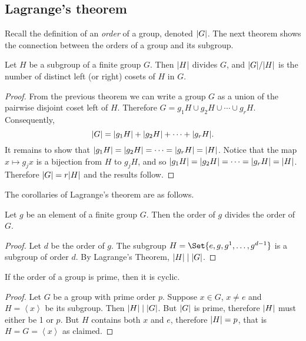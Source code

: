 \documentclass[main.tex]{subfiles}
\begin{document}
			\subsection{Lagrange’s theorem}
			Recall the definition of an \textit{order} of a group, denoted $\lvert G\rvert$. The next theorem shows the connection between the orders of a group and its subgroup.
				\begin{theorem} 
					Let $H$ be a subgroup of a finite group $G$. Then $\lvert H\rvert$ divides $G$, and $\lvert G\rvert/\lvert H\rvert$ is the number of distinct left (or right) cosets of $H$ in $G$.
				\end{theorem}
				\begin{proof}
					From the previous theorem we can write a group $G$ as a union of the pairwise disjoint coset left of $H$. Therefore $G = g_1H \cup g_2 H \cup \cdots \cup g_r H$. Consequently,
					\begin{equation*}
						\lvert G\rvert = \lvert g_1 H\rvert + \lvert g_2 H\rvert + \cdots + \lvert g_r H\rvert.
					\end{equation*}
					It remains to show that $\lvert g_1 H\rvert = \lvert g_2 H\rvert = \cdots = \lvert g_r H\rvert = \lvert H\rvert$. Notice that the map $x \mapsto g_j x$ is a bijection from $H$ to $g_j H$, and so $\lvert g_1 H\rvert = \lvert g_2 H\rvert = \cdots = \lvert g_r H\rvert = \lvert H\rvert$. Therefore $\lvert G\rvert = r\lvert H\rvert$ and the results follow.
				\end{proof}
			
			The corollaries of Lagrange's theorem are as follows.
			\begin{corollary}
					Let $g$ be an element of a finite group $G$. Then the order of $g$ divides the order of $G$.
			\end{corollary}
			\begin{proof}
				Let $d$ be the order of $g$. The subgroup $H = \Set{e, g, g^1, \ldots, g^{d-1}}$ is a subgroup of order $d$. By Lagrange's Theorem, $\lvert H\rvert \mid \lvert G\rvert$.
			\end{proof}
		
			\begin{corollary}
				If the order of a group is prime, then it is cyclic.
			\end{corollary}
				\begin{proof}
					Let $G$ be a group with prime order $p$. Suppose $x \in G$, $x \neq e$ and $H = \left\langle x \right\rangle $ be its subgroup. Then $\lvert H\rvert \mid \lvert G\rvert$. But $\lvert G\rvert$ is prime, therefore $\lvert H\rvert$ must either be 1 or $p$. But $H$ contains both $x$ and $e$, therefore $\lvert H\rvert = p$, that is $H = G = \left\langle x \right\rangle $ as claimed.
				\end{proof}
\end{document}
